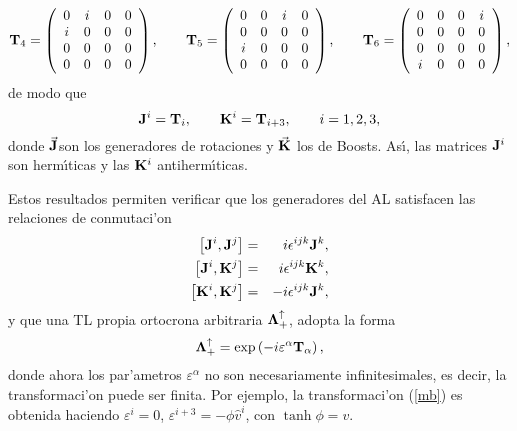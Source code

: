 \begin{equation}
{\bf T}_{4}=\left( 
\begin{array}{cccc}
0 & i & 0 & 0 \\ 
i & 0 & 0 & 0 \\ 
0 & 0 & 0 & 0 \\ 
0 & 0 & 0 & 0
\end{array}
\right) ,\qquad {\bf T}_{5}=\left( 
\begin{array}{cccc}
0 & 0 & i & 0 \\ 
0 & 0 & 0 & 0 \\ 
i & 0 & 0 & 0 \\ 
0 & 0 & 0 & 0
\end{array}
\right) ,\qquad {\bf T}_{6}=\left( 
\begin{array}{cccc}
0 & 0 & 0 & i \\ 
0 & 0 & 0 & 0 \\ 
0 & 0 & 0 & 0 \\ 
i & 0 & 0 & 0
\end{array}
\right) ,  \label{d2}
\end{equation}
de modo que 
\begin{equation}
{\bf J}^{i}={\bf T}_{i},\qquad {\bf K}^{i}={\bf T}_{i+3},\qquad i=1,2,3, 
\end{equation}
donde $\vec{{\bf J}}$son los generadores de rotaciones y $%
\vec{{\bf K}}$ los de Boosts. As{\'{\i }}, las matrices ${\bf J}%
^{i}$ son herm{\'{\i }}ticas y las ${\bf K}^{i}$ antiherm{\'{\i }}ticas.

Estos resultados permiten verificar que los generadores del AL satisfacen
las relaciones de conmutaci'on 
\begin{eqnarray}
\left[ {\bf J}^{i},{\bf J}^{j}\right] &=&i\epsilon ^{ijk}{\bf J}^{k},
\label{allor1} \\
\left[ {\bf J}^{i},{\bf K}^{j}\right] &=&i\epsilon ^{ijk}{\bf K}^{k},
\label{allor2} \\
\left[ {\bf K}^{i},{\bf K}^{j}\right] &=&-i\epsilon ^{ijk}{\bf J}^{k},
\label{allor3}
\end{eqnarray}
y que una TL propia ortocrona arbitraria ${\bf \Lambda }_{+}^{\uparrow }$,
adopta la forma 
\begin{equation}
{\bf \Lambda }_{+}^{\uparrow }=\exp \left( -i\varepsilon ^{\alpha }{\bf T}%
_{\alpha }\right) ,  \label{exp}
\end{equation}
donde ahora los par'ametros $\varepsilon ^{\alpha }$ no son
necesariamente infinitesimales, es decir, la transformaci'on puede ser
finita. Por ejemplo, la transformaci'on (\ref{mb}) es obtenida haciendo $%
\varepsilon ^{i}=0$, $\varepsilon ^{i+3}=-\phi \widehat{v}^{i}$, con $\tanh
\phi=v$.

